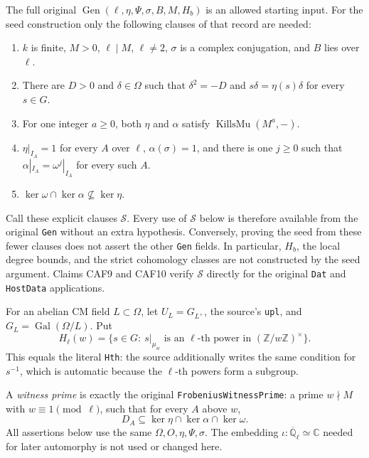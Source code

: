 The full original \(\operatorname{Gen}(\ell,\eta,\Psi,\sigma,B,M,H_b)\)
is an allowed starting input.  For the seed construction only the
following clauses of that record are needed:
\begin{enumerate}
\item \(k\) is finite, \(M>0\), \(\ell\mid M\), \(\ell\ne2\),
      \(\sigma\) is a complex conjugation, and \(B\) lies over \(\ell\).
\item There are \(D>0\) and \(\delta\in\Omega\) such that
      \(\delta^2=-D\) and \(s\delta=\eta(s)\delta\) for every \(s\in G\).
\item For one integer \(a\ge0\), both \(\eta\) and \(\alpha\)
      satisfy \(\operatorname{KillsMu}(M^a,-)\).
\item \(\eta|_{I_A}=1\) for every \(A\) over \(\ell\),
      \(\alpha(\sigma)=1\), and there is one \(j\ge0\) such that
      \(\alpha|_{I_A}=\omega^j|_{I_A}\) for every such \(A\).
\item \(\ker\omega\cap\ker\alpha\not\subseteq\ker\eta\).
\end{enumerate}
Call these explicit clauses \(\mathcal S\).  Every use of
\(\mathcal S\) below is therefore available from the original
\texttt{Gen} without an extra hypothesis.  Conversely, proving the
seed from these fewer clauses does not assert the other
\texttt{Gen} fields.  In particular, \(H_b\), the local degree bounds,
and the strict cohomology classes are not constructed by the seed
argument.  Claims CAF9 and CAF10 verify \(\mathcal S\) directly for
the original \texttt{Dat} and \texttt{HostData} applications.

For an abelian CM field \(L\subset\Omega\), let
\(U_L=G_{L^+}\), the source's \texttt{upl}, and
\(G_L=\operatorname{Gal}(\Omega/L)\).  Put
\[
 H_\ell(w)=\{s\in G:\ s|_{\mu_w}\text{ is an }\ell
                  \text{-th power in }(\mathbb Z/w\mathbb Z)^\times\}.
 \tag{CAF.3}
\]
This equals the literal \texttt{Hth}: the source additionally writes
the same condition for \(s^{-1}\), which is automatic because the
\(\ell\)-th powers form a subgroup.

A \emph{witness prime} is exactly the original
\texttt{FrobeniusWitnessPrime}: a prime \(w\nmid M\) with
\(w\equiv1\pmod\ell\), such that for every \(A\) above \(w\),
\[
          D_A\subseteq\ker\eta\cap\ker\alpha\cap\ker\omega.
 \tag{CAF.4}
\]
All assertions below use the same \(\Omega,O,\eta,\Psi,\sigma\).
The embedding \(\iota:\overline{\mathbb Q}_\ell\simeq\mathbb C\)
needed for later automorphy is not used or changed here.

